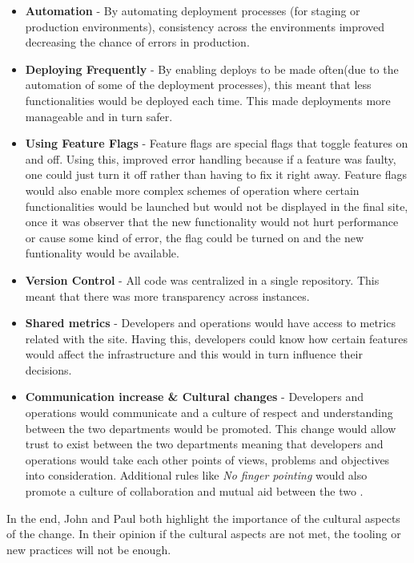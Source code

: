         \begin{itemize}
          \item \textbf{Automation} - By automating deployment processes (for staging or production environments), consistency across the environments improved decreasing the chance of errors in production.
          \item \textbf{Deploying Frequently} - By enabling deploys to be made often(due to the automation of some of the deployment processes), this meant that less functionalities would be deployed each time. This made deployments more manageable and in turn safer.
          \item \textbf{Using Feature Flags} - Feature flags are special flags that toggle features on and off. Using this, improved error handling because if a feature was faulty, one could just turn it off rather than having to fix it right away. Feature flags would also enable more complex schemes of operation where certain functionalities would be launched but would not be displayed in the final site, once it was observer that the new functionality would not hurt performance or cause some kind of error, the flag could be turned on and the new funtionality would be available.
          \item \textbf{Version Control} - All code was centralized in a single repository. This meant that there was more transparency across instances.
          \item \textbf{Shared metrics} - Developers and operations would have access to metrics related with the site. Having this, developers could know how certain features would affect the infrastructure and this would in turn influence their decisions.
          \item \textbf{Communication increase \& Cultural changes} - Developers and operations would communicate and a culture of respect and understanding between the two departments would be promoted. This change would allow trust to exist between the two departments meaning that developers and operations would take each other points of views, problems and objectives into consideration. Additional rules like \textit{No finger pointing} would also promote a culture of collaboration and mutual aid between the two .
        \end{itemize}
      In the end, John and Paul both highlight the importance of the cultural aspects of the change. In their opinion if the cultural aspects are not met, the tooling or new practices will not be enough.


